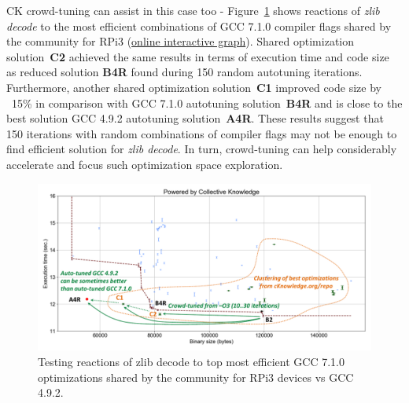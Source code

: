 CK crowd-tuning can assist in this case too - Figure~\ref{fig:autotuning-zlib-decode-gcc7-reactions}
shows reactions of \textit{zlib decode} to the most efficient combinations of GCC 7.1.0 compiler flags
shared by the community for RPi3 
(\href{http://cknowledge.org/repo/web.php?wcid=graph:a53089441c68c978&subgraph=rpi3-autotuning-zlib-decode-gcc7-reactions-interactive}{online interactive graph}).
%
Shared optimization solution~\textbf{C2} achieved the same results in terms of execution time and code size
as reduced solution \textbf{B4R} found during 150 random autotuning iterations.
%
Furthermore, another shared optimization solution~\textbf{C1} improved code size by ~15\% in comparison
with GCC 7.1.0 autotuning solution~\textbf{B4R} and is close to the best solution GCC 4.9.2 autotuning solution~\textbf{A4R}.
%
These results suggest that 150 iterations with random combinations of compiler flags 
may not be enough to find efficient solution for \textit{zlib decode}.
%
In turn, crowd-tuning can help considerably accelerate and focus such optimization space exploration.

   \begin{figure}[!htbp]
     \centering
      \includegraphics[width=5.2in]
      {ck-assets/74ba8b07475626f5-cropped.pdf} %
      \vspace{0.1in}
      \vspace{0.1in}
     \caption{
      Testing reactions of zlib decode to top most efficient GCC 7.1.0 optimizations shared by the community for RPi3 devices vs GCC 4.9.2.
     }
     \label{fig:autotuning-zlib-decode-gcc7-reactions}
   \end{figure}

